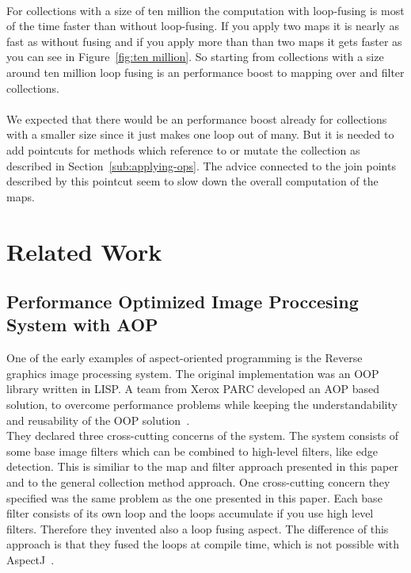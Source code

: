 \documentclass[runningheads,a4paper]{llncs}
\begin{document}
\\
For collections with a size of ten million the computation with loop-fusing is most of the time faster than without loop-fusing.
If you apply two maps it is nearly as fast as without fusing and if you apply more than than two maps it gets faster as you can see in Figure~\ref{fig:ten million}.
So starting from collections with a size around ten million loop fusing is an performance boost to mapping over and filter collections.\\
\\
We expected that there would be an performance boost already for collections with a smaller size since it just makes one loop out of many.
But it is needed to add pointcuts for methods which reference to or mutate the collection as described in Section~\ref{sub:applying-ops}.
The advice connected to the join points described by this pointcut seem to slow down the overall computation of the maps.

\section{Related Work}\label{sec:related-work}

\subsection{Performance Optimized Image Proccesing System with AOP}
One of the early examples of aspect-oriented programming is the Reverse graphics image processing system. The original implementation was an OOP library written in LISP.
A team from Xerox PARC developed an AOP based solution, to overcome performance problems while keeping the understandability and reusability of the OOP solution~\cite{mendhekar1997rg}.\\
They declared three cross-cutting concerns of the system.
The system consists of some base image filters which can be combined to high-level filters, like edge detection.
This is similiar to the map and filter approach presented in this paper and to the general collection method approach.
One cross-cutting concern they specified was the same problem as the one presented in this paper. Each base filter consists of its own loop and the loops accumulate if you use high level filters.
Therefore they invented also a loop fusing aspect. The difference of this approach is that they fused the loops at compile time, which is not possible with AspectJ~\cite{mendhekar1997rg}.
\end{document}

